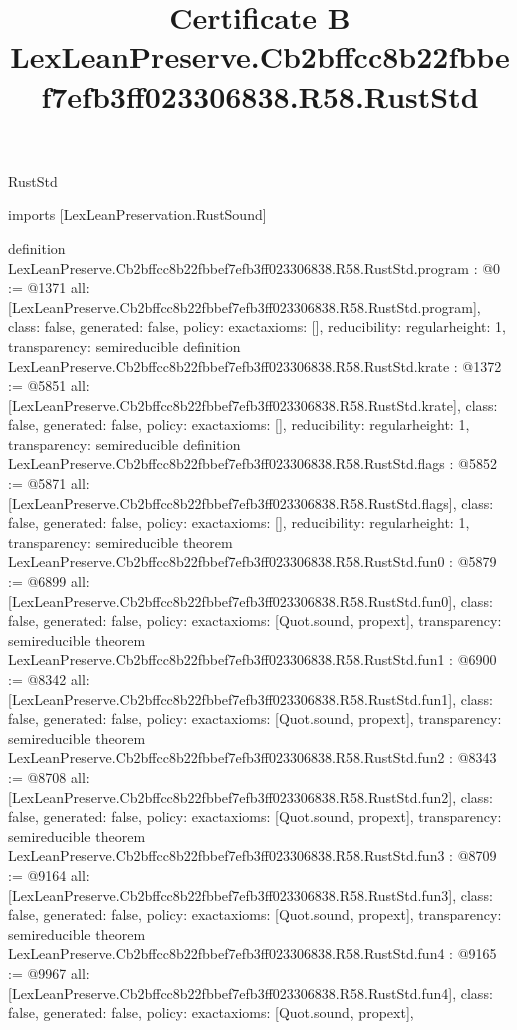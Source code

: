\begin{lexlean}{RustStd}
\title{Certificate B LexLeanPreserve.Cb2bffcc8b22fbbef7efb3ff023306838.R58.RustStd}
\begin{coremodule}
imports [LexLeanPreservation.RustSound]

definition LexLeanPreserve.Cb2bffcc8b22fbbef7efb3ff023306838.R58.RustStd.program : @0 := @1371 {
  all: [LexLeanPreserve.Cb2bffcc8b22fbbef7efb3ff023306838.R58.RustStd.program],
  class: false,
  generated: false,
  policy: exact{axioms: []},
  reducibility: regular{height: 1},
  transparency: semireducible
}
definition LexLeanPreserve.Cb2bffcc8b22fbbef7efb3ff023306838.R58.RustStd.krate : @1372 := @5851 {
  all: [LexLeanPreserve.Cb2bffcc8b22fbbef7efb3ff023306838.R58.RustStd.krate],
  class: false,
  generated: false,
  policy: exact{axioms: []},
  reducibility: regular{height: 1},
  transparency: semireducible
}
definition LexLeanPreserve.Cb2bffcc8b22fbbef7efb3ff023306838.R58.RustStd.flags : @5852 := @5871 {
  all: [LexLeanPreserve.Cb2bffcc8b22fbbef7efb3ff023306838.R58.RustStd.flags],
  class: false,
  generated: false,
  policy: exact{axioms: []},
  reducibility: regular{height: 1},
  transparency: semireducible
}
theorem LexLeanPreserve.Cb2bffcc8b22fbbef7efb3ff023306838.R58.RustStd.fun0 : @5879 := @6899 {
  all: [LexLeanPreserve.Cb2bffcc8b22fbbef7efb3ff023306838.R58.RustStd.fun0],
  class: false,
  generated: false,
  policy: exact{axioms: [Quot.sound, propext]},
  transparency: semireducible
}
theorem LexLeanPreserve.Cb2bffcc8b22fbbef7efb3ff023306838.R58.RustStd.fun1 : @6900 := @8342 {
  all: [LexLeanPreserve.Cb2bffcc8b22fbbef7efb3ff023306838.R58.RustStd.fun1],
  class: false,
  generated: false,
  policy: exact{axioms: [Quot.sound, propext]},
  transparency: semireducible
}
theorem LexLeanPreserve.Cb2bffcc8b22fbbef7efb3ff023306838.R58.RustStd.fun2 : @8343 := @8708 {
  all: [LexLeanPreserve.Cb2bffcc8b22fbbef7efb3ff023306838.R58.RustStd.fun2],
  class: false,
  generated: false,
  policy: exact{axioms: [Quot.sound, propext]},
  transparency: semireducible
}
theorem LexLeanPreserve.Cb2bffcc8b22fbbef7efb3ff023306838.R58.RustStd.fun3 : @8709 := @9164 {
  all: [LexLeanPreserve.Cb2bffcc8b22fbbef7efb3ff023306838.R58.RustStd.fun3],
  class: false,
  generated: false,
  policy: exact{axioms: [Quot.sound, propext]},
  transparency: semireducible
}
theorem LexLeanPreserve.Cb2bffcc8b22fbbef7efb3ff023306838.R58.RustStd.fun4 : @9165 := @9967 {
  all: [LexLeanPreserve.Cb2bffcc8b22fbbef7efb3ff023306838.R58.RustStd.fun4],
  class: false,
  generated: false,
  policy: exact{axioms: [Quot.sound, propext]},
}
\end{coremodule}
\end{lexlean}
